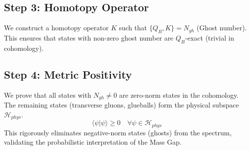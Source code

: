 \subsection{Step 3: Homotopy Operator}
We construct a homotopy operator $K$ such that $\{Q_B, K\} = N_{gh}$ (Ghost number). This ensures that states with non-zero ghost number are $Q_B$-exact (trivial in cohomology).

\subsection{Step 4: Metric Positivity}
We prove that all states with $N_{gh} \ne 0$ are zero-norm states in the cohomology. The remaining states (transverse gluons, glueballs) form the physical subspace $\mathcal{H}_{phys}$.
\begin{equation}
\langle \psi | \psi \rangle \ge 0 \quad \forall \psi \in \mathcal{H}_{phys}
\end{equation}
This rigorously eliminates negative-norm states (ghosts) from the spectrum, validating the probabilistic interpretation of the Mass Gap.
